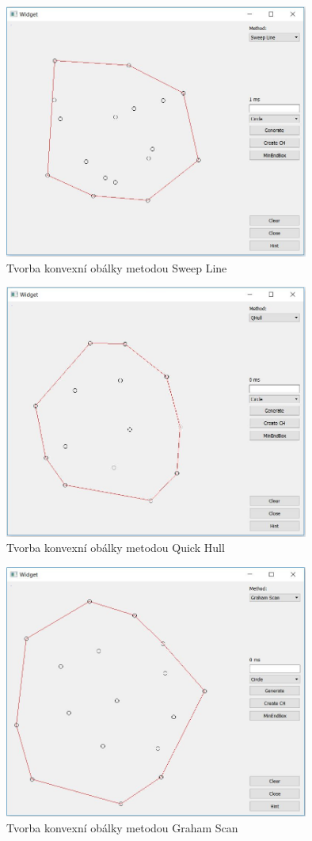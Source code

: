\documentclass[a4paper, 12pt]{article}
\begin{document}
\begin{figure}[h!]
	\centering
	\includegraphics[width=10cm]{sweepline_ch.jpg}
	\caption{Tvorba konvexní obálky metodou Sweep Line}
\end{figure}

\begin{figure}[h!]
	\centering
	\includegraphics[width=10cm]{qhull_ch.jpg}
	\caption{Tvorba konvexní obálky metodou Quick Hull}
\end{figure}

\begin{figure}[h!]
	\centering
	\includegraphics[width=10cm]{grahamscan_ch.jpg}
	\caption{Tvorba konvexní obálky metodou Graham Scan}
\end{figure}
\end{document}
